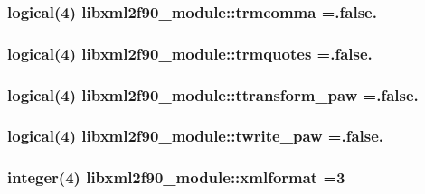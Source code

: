 \subsubsection[{trmcomma}]{\setlength{\rightskip}{0pt plus 5cm}logical(4) libxml2f90\+\_\+module\+::trmcomma =.false.}\label{namespacelibxml2f90__module_a01eddf97a14bcc393835cd086f78dfdf}
\hypertarget{namespacelibxml2f90__module_aa7358595240bdca537fc1e126fb8f6a8}{}
\subsubsection[{trmquotes}]{\setlength{\rightskip}{0pt plus 5cm}logical(4) libxml2f90\+\_\+module\+::trmquotes =.false.}\label{namespacelibxml2f90__module_aa7358595240bdca537fc1e126fb8f6a8}
\hypertarget{namespacelibxml2f90__module_a57a7bbf9cf74f527371bfb5496135bdf}{}
\subsubsection[{ttransform\+\_\+paw}]{\setlength{\rightskip}{0pt plus 5cm}logical(4) libxml2f90\+\_\+module\+::ttransform\+\_\+paw =.false.}\label{namespacelibxml2f90__module_a57a7bbf9cf74f527371bfb5496135bdf}
\hypertarget{namespacelibxml2f90__module_aaba636a60c116ce3dfa158403414d3b1}{}
\subsubsection[{twrite\+\_\+paw}]{\setlength{\rightskip}{0pt plus 5cm}logical(4) libxml2f90\+\_\+module\+::twrite\+\_\+paw =.false.}\label{namespacelibxml2f90__module_aaba636a60c116ce3dfa158403414d3b1}
\hypertarget{namespacelibxml2f90__module_a6e7d9498a3938eb57c8ff2020118098e}{}
\subsubsection[{xmlformat}]{\setlength{\rightskip}{0pt plus 5cm}integer(4) libxml2f90\+\_\+module\+::xmlformat =3}\label{namespacelibxml2f90__module_a6e7d9498a3938eb57c8ff2020118098e}
